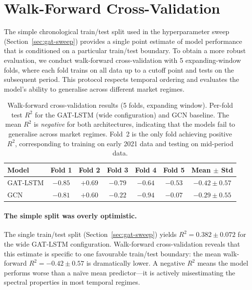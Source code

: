 \section{Walk-Forward Cross-Validation}
\label{sec:walk-forward}

The simple chronological train/test split used in the hyperparameter sweep (Section~\ref{sec:gat-sweep}) provides a single point estimate of model performance that is conditioned on a particular train/test boundary. To obtain a more robust evaluation, we conduct walk-forward cross-validation with 5 expanding-window folds, where each fold trains on all data up to a cutoff point and tests on the subsequent period. This protocol respects temporal ordering and evaluates the model's ability to generalise across different market regimes.

\begin{table}[H]
\centering
\caption{Walk-forward cross-validation results (5 folds, expanding window). Per-fold test $R^2$ for the GAT-LSTM (wide configuration) and GCN baseline. The mean $R^2$ is \emph{negative} for both architectures, indicating that the models fail to generalise across market regimes. Fold~2 is the only fold achieving positive $R^2$, corresponding to training on early 2021 data and testing on mid-period data.}
\label{tab:walk-forward}
\begin{tabular}{lccccc|c}
\toprule
\textbf{Model} & \textbf{Fold 1} & \textbf{Fold 2} & \textbf{Fold 3} & \textbf{Fold 4} & \textbf{Fold 5} & \textbf{Mean $\pm$ Std} \\
\midrule
GAT-LSTM & $-0.85$ & $+0.69$ & $-0.79$ & $-0.64$ & $-0.53$ & $-0.42 \pm 0.57$ \\
GCN      & $-0.81$ & $+0.60$ & $-0.22$ & $-0.94$ & $-0.07$ & $-0.29 \pm 0.55$ \\
\bottomrule
\end{tabular}
\end{table}

\paragraph{The simple split was overly optimistic.}
The single train/test split (Section~\ref{sec:gat-sweep}) yields $R^2 = 0.382 \pm 0.072$ for the wide GAT-LSTM configuration. Walk-forward cross-validation reveals that this estimate is specific to one favourable train/test boundary: the mean walk-forward $R^2 = -0.42 \pm 0.57$ is dramatically lower. A negative $R^2$ means the model performs worse than a na\"ive mean predictor---it is actively misestimating the spectral properties in most temporal regimes.

